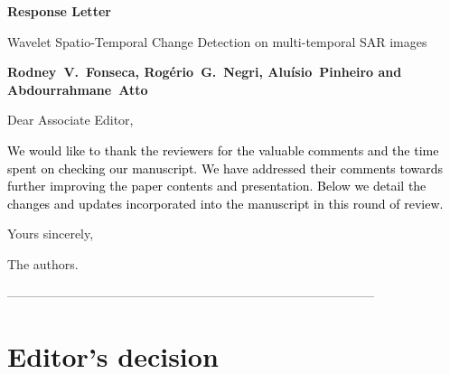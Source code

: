\documentclass[11pt]{report}
\begin{document}
\begin{center}
\large{\textbf{Response Letter}}

\vglue 0.3cm

\huge{Wavelet Spatio-Temporal Change Detection on multi-temporal SAR images}
\end{center}

\begin{center}
\textbf{Rodney~V.~Fonseca, Rog\'{e}rio~G.~Negri, Alu\'{i}sio~Pinheiro and Abdourrahmane~Atto}
\end{center}

\date{\today}


\vspace{2cm}
\noindent Dear Associate Editor,
\bigskip

\textcolor{black}{We would like to thank the reviewers for the valuable comments and the time spent on checking our manuscript. 
We have addressed their comments towards further improving the paper contents and presentation. 
Below we detail the changes and updates incorporated into the manuscript in this round of review.}


\medskip
\noindent Yours sincerely,

\begin{flushright}
\noindent The authors.
\end{flushright}




\noindent---------------------------------------------------------------------------------------
\section*{Editor's decision}
\end{document}
